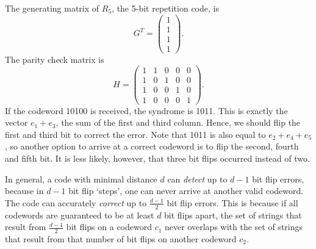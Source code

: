 \begin{example}
The generating matrix of $R_5$, the 5-bit repetition code, is
\[G^T = \left(\begin{array}{c}
1\\1\\1\\1
\end{array}\right).\]
The parity check matrix is
\[
H = \left(\begin{array}{ccccc}
1&1&0&0&0\\
1&0&1&0&0\\
1&0&0&1&0\\
1&0&0&0&1
\end{array}\right).\]
If the codeword 10100 is received, the syndrome is 1011. This is exactly the vector $e_1 + e_3$, the sum of the first and third column. Hence, we should flip the first and third bit to correct the error. Note that 1011 is also equal to $e_2 + e_4 + e_5$, so another option to arrive at a correct codeword is to flip the second, fourth and fifth bit. It is less likely, however, that three bit flips occurred instead of two.
\end{example}
In general, a code with minimal distance $d$ can \emph{detect} up to $d-1$ bit flip errors, because in $d-1$ bit flip `steps', one can never arrive at another valid codeword. The code can accurately \emph{correct} up to $\frac{d-1}{2}$ bit flip errors. This is because if all codewords are guaranteed to be at least $d$ bit flips apart, the set of strings that result from $\frac{d-1}{2}$ bit flips on a codeword $c_1$ never overlaps with the set of strings that result from that number of bit flips on another codeword $c_2$.

